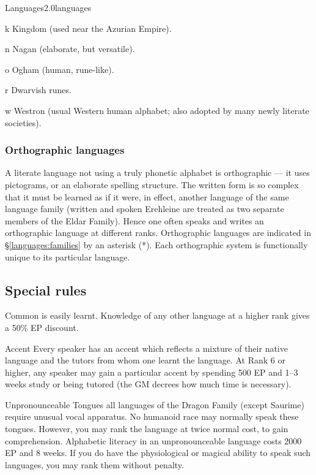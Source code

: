 \begin{skill}{Languages}{2.0}{languages}
\begin{Description}
\item[k] Kingdom (used near  the Azurian Empire).

\item[n] Nagan (elaborate, but versatile).

\item[o] Ogham (human, rune-like).

\item[r] Dwarvish runes.

\item[w] Westron (usual Western human alphabet; also adopted by many
newly literate societies).


\end{Description}

\subsubsection{Orthographic languages}

A literate language not using a truly phonetic alphabet is
orthographic --- \eg it uses pictograms, or an elaborate spelling
structure. The written form is so complex that it must be learned as
if it were, in effect, another language of the same language family
(\eg written and spoken Erehleine are treated as two separate members
of the Eldar Family). Hence one often speaks and writes an
orthographic language at different ranks. Orthographic languages are
indicated in \S\ref{languages:families} by an asterisk (*). Each
orthographic system is functionally unique to its particular language.

\subsection{Special rules}

\begin{Description}

\item[Common] is easily learnt. Knowledge of any other language at a
higher rank gives a 50\% EP discount.

\item[Accent] Every speaker has an accent which reflects a mixture of
their native language and the tutors from whom one learnt the
language.  At Rank 6 or higher, any speaker may gain a particular
accent by spending 500 EP and 1--3 weeks study or being tutored (the
GM decrees how much time is necessary).

\item[Unpronounceable Tongues] all languages of the Dragon Family
(except Saurime) require unusual vocal apparatus. No humanoid race may
normally speak these tongues. However, you may rank the language at
twice normal cost, to gain comprehension. Alphabetic literacy in an
unpronounceable language costs 2000 EP and 8 weeks. If you do have the
physiological or magical ability to speak such languages, you may rank
them without penalty.


\end{Description}
\end{skill}
